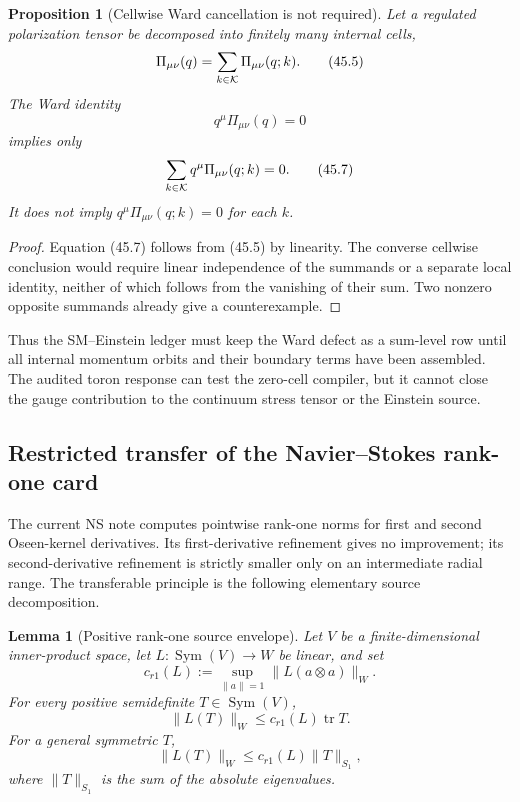 \documentclass[11pt]{article}
\newtheorem{lemma}[theorem]{Lemma}
\newtheorem{proposition}[theorem]{Proposition}
\begin{document}
\begin{proposition}[Cellwise Ward cancellation is not required]
\label{prop:v11v45-cellwise-ward}
Let a regulated polarization tensor be decomposed into finitely many
internal cells,
\[
                   \Pi_{\mu\nu}(q)=\sum_{k\in{\cal K}}
                                  \Pi_{\mu\nu}(q;k).            \tag{45.5}
\]
The Ward identity
\[
                         q^\mu\Pi_{\mu\nu}(q)=0                \tag{45.6}
\]
implies only
\[
          \sum_{k\in{\cal K}}q^\mu\Pi_{\mu\nu}(q;k)=0.         \tag{45.7}
\]
It does not imply
\(q^\mu\Pi_{\mu\nu}(q;k)=0\) for each \(k\).
\end{proposition}

\begin{proof}
Equation (45.7) follows from (45.5) by linearity.  The converse
cellwise conclusion would require linear independence of the summands
or a separate local identity, neither of which follows from the
vanishing of their sum.  Two nonzero opposite summands already give a
counterexample.
\end{proof}

Thus the SM--Einstein ledger must keep the Ward defect as a
sum-level row until all internal momentum orbits and their boundary
terms have been assembled.  The audited toron response can test the
zero-cell compiler, but it cannot close the gauge contribution to the
continuum stress tensor or the Einstein source.

\subsection{Restricted transfer of the Navier--Stokes rank-one card}

The current NS note computes pointwise rank-one norms for first and
second Oseen-kernel derivatives.  Its first-derivative refinement gives
no improvement; its second-derivative refinement is strictly smaller
only on an intermediate radial range.  The transferable principle is
the following elementary source decomposition.

\begin{lemma}[Positive rank-one source envelope]
\label{lem:v11v45-rank-one-envelope}
Let \(V\) be a finite-dimensional inner-product space, let
\(L:\operatorname{Sym}(V)\to W\) be linear, and set
\[
 c_{r1}(L):=\sup_{\lVert a\rVert=1}
                     \lVert L(a\otimes a)\rVert_W.             \tag{45.8}
\]
For every positive semidefinite \(T\in\operatorname{Sym}(V)\),
\[
                         \lVert L(T)\rVert_W
                    \le c_{r1}(L)\operatorname{tr}T.           \tag{45.9}
\]
For a general symmetric \(T\),
\[
                         \lVert L(T)\rVert_W
                    \le c_{r1}(L)\lVert T\rVert_{S_1},         \tag{45.10}
\]
where \(\lVert T\rVert_{S_1}\) is the sum of the absolute eigenvalues.
\end{lemma}
\end{document}

